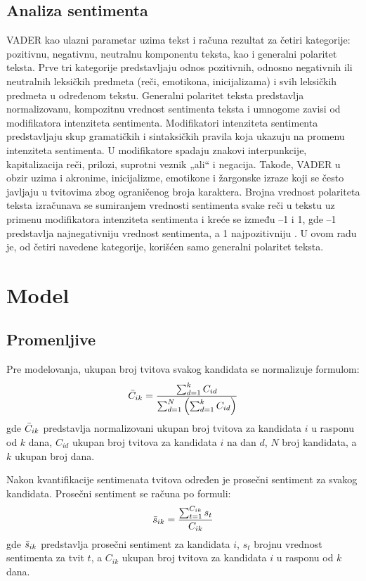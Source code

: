 \subsection{Analiza sentimenta}

VADER kao ulazni parametar uzima tekst i računa rezultat za četiri kategorije: pozitivnu, negativnu, neutralnu komponentu teksta, kao i generalni polaritet teksta. Prve tri kategorije predstavljaju odnos pozitivnih, odnosno negativnih ili neutralnih leksičkih predmeta (reči, emotikona, inicijalizama) i svih leksičkih predmeta u određenom tekstu. Generalni polaritet teksta predstavlja normalizovanu, kompozitnu vrednost sentimenta teksta i umnogome zavisi od modifikatora intenziteta sentimenta. Modifikatori intenziteta sentimenta predstavljaju skup gramatičkih i sintaksičkih pravila koja ukazuju na promenu intenziteta sentimenta. U modifikatore spadaju znakovi interpunkcije, kapitalizacija reči, prilozi, suprotni veznik „ali“ i negacija. Takođe, VADER u obzir uzima i akronime, inicijalizme, emotikone i žargonske izraze koji se često javljaju u tvitovima zbog ograničenog broja karaktera. Brojna vrednost polariteta teksta izračunava se sumiranjem vrednosti sentimenta svake reči u tekstu uz primenu modifikatora intenziteta sentimenta i kreće se između –1 i 1, gde –1 predstavlja najnegativniju vrednost sentimenta, a 1 najpozitivniju \parencite{hutto2014vader}. U ovom radu je, od četiri navedene kategorije, korišćen samo generalni polaritet teksta.

\section{Model}

\subsection{Promenljive}

Pre modelovanja, ukupan broj tvitova svakog kandidata se normalizuje formulom:
\begin{equation*}
    \Bar{C}_{ik}=\frac{\sum^{k}_{d=1} C_{id}}{\sum^N_{d=1}\left(\sum^k_{d=1}C_{id}\right)}
\end{equation*}
gde $\Bar{C}_{ik}$ predstavlja normalizovani ukupan broj tvitova za kandidata $i$ u rasponu od $k$ dana, $C_{id}$ ukupan broj tvitova za kandidata $i$ na dan $d$, $N$ broj kandidata, a $k$ ukupan broj dana.

Nakon kvantifikacije sentimenata tvitova određen je prosečni sentiment za svakog kandidata. Prosečni sentiment se računa po formuli:
\begin{equation*}
    \Bar{s}_{ik}=\frac{\sum^{C_{ik}}_{t=1} s_t}{C_{ik}}
\end{equation*}
gde $\Bar{s}_{ik}$ predstavlja prosečni sentiment za kandidata $i$, $s_t$ brojnu vrednost sentimenta za tvit $t$, a $C_{ik}$ ukupan broj tvitova za kandidata $i$ u rasponu od $k$ dana.

